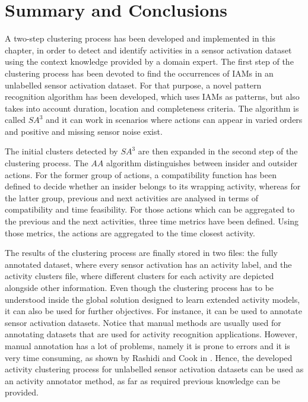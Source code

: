 \section{Summary and Conclusions}
\label{sec:clustering:sum}

A two-step clustering process has been developed and implemented in this chapter, in order to detect and identify activities in a sensor activation dataset using the context knowledge provided by a domain expert. The first step of the clustering process has been devoted to find the occurrences of IAMs in an unlabelled sensor activation dataset. For that purpose, a novel pattern recognition algorithm has been developed, which uses IAMs as patterns, but also takes into account duration, location and completeness criteria. The algorithm is called $SA^3$ and it can work in scenarios where actions can appear in varied orders and positive and missing sensor noise exist.

The initial clusters detected by $SA^3$ are then expanded in the second step of the clustering process. The $AA$ algorithm distinguishes between insider and outsider actions. For the former group of actions, a compatibility function has been defined to decide whether an insider belongs to its wrapping activity, whereas for the latter group, previous and next activities are analysed in terms of compatibility and time feasibility. For those actions which can be aggregated to the previous and the next activities, three time metrics have been defined. Using those metrics, the actions are aggregated to the time closest activity. 

The results of the clustering process are finally stored in two files: the fully annotated dataset, where every sensor activation has an activity label, and the activity clusters file, where different clusters for each activity are depicted alongside other information. Even though the clustering process has to be understood inside the global solution designed to learn extended activity models, it can also be used for further objectives. For instance, it can be used to annotate sensor activation datasets. Notice that manual methods are usually used for annotating datasets that are used for activity recognition applications. However, manual annotation has a lot of problems, namely it is prone to errors and it is very time consuming, as shown by Rashidi and Cook in \cite{Rashidi2011}. Hence, the developed activity clustering process for unlabelled sensor activation datasets can be used as an activity annotator method, as far as required previous knowledge can be provided. 